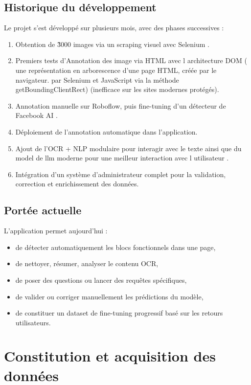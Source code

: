 \documentclass[12pt,a4paper]{report}
\begin{document}
\section{Historique du développement}

Le projet s'est développé sur plusieurs mois, avec des phases successives :
\begin{enumerate}
\item Obtention de \~ 3000 images via un scraping visuel avec Selenium .
\item Premiers tests d'Annotation des image via  HTML avec l architecture DOM ( une représentation en arborescence d'une page HTML, créée par le navigateur. par Selenium et JavaScript via la méthode getBoundingClientRect) (inefficace sur les sites modernes protégés).

\item Annotation manuelle sur Roboflow, puis fine-tuning d'un détecteur de Facebook AI .
\item Déploiement de l'annotation automatique dans l'application.
\item Ajout de l'OCR + NLP modulaire pour interagir avec le texte ainsi que du model de llm moderne pour une meilleur interaction avec l utilisateur .
\item Intégration d'un système d'administrateur complet pour la validation, correction et enrichissement des données.
\end{enumerate}

\section{Portée actuelle}

L'application permet aujourd'hui :
\begin{itemize}
\item de détecter automatiquement les blocs fonctionnels dans une page,
\item de nettoyer, résumer, analyser le contenu OCR,
\item de poser des questions ou lancer des requêtes spécifiques,
\item de valider ou corriger manuellement les prédictions du modèle,
\item de constituer un dataset de fine-tuning progressif basé sur les retours utilisateurs.
\end{itemize}

\chapter{ Constitution et acquisition des données}
\end{document}
